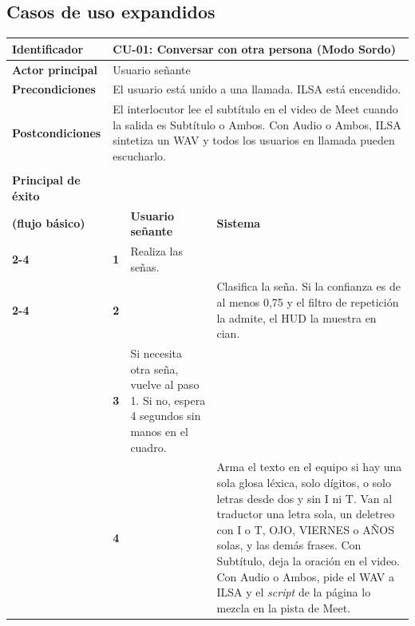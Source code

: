 \subsection{Casos de uso expandidos}

\begin{table}[h!]
\centering
\renewcommand{\arraystretch}{1.35}
\begin{tabularx}{\textwidth}{|>{\raggedright\arraybackslash\bfseries}p{4cm}|p{0.5cm}|X|X|}
\hline
Identificador & \multicolumn{3}{p{\dimexpr\textwidth-4.5cm-4\tabcolsep\relax}|}{\textbf{CU-01: Conversar con otra persona (Modo Sordo)}} \\ \hline
Actor principal & \multicolumn{3}{p{\dimexpr\textwidth-4.5cm-4\tabcolsep\relax}|}{Usuario señante} \\ \hline
Precondiciones & \multicolumn{3}{p{\dimexpr\textwidth-4.5cm-4\tabcolsep\relax}|}{El usuario está unido a una llamada. ILSA está encendido.} \\ \hline
Postcondiciones & \multicolumn{3}{p{\dimexpr\textwidth-4.5cm-4\tabcolsep\relax}|}{El interlocutor lee el subtítulo en el video de Meet cuando la salida es Subtítulo o Ambos. Con Audio o Ambos, ILSA sintetiza un WAV y todos los usuarios en llamada pueden escucharlo.} \\ \hline
\multirow{3}{4cm}{Escenario\\ Principal de éxito\\ (flujo básico)}
 & & \textbf{Usuario señante} & \textbf{Sistema} \\ \cline{2-4}
 & \textbf{1} & Realiza las señas. & \\ \cline{2-4}
 & \textbf{2} & & Clasifica la seña. Si la confianza es de al menos 0,75 y el filtro de repetición la admite, el HUD la muestra en cian. \\ \hline
 & \textbf{3} & Si necesita otra seña, vuelve al paso 1. Si no, espera 4 segundos sin manos en el cuadro. &  \\ \hline
 & \textbf{4} & & Arma el texto en el equipo si hay una sola glosa léxica, solo dígitos, o solo letras desde dos y sin I ni T. Van al traductor una letra sola, un deletreo con I o T, OJO, VIERNES o AÑOS solas, y las demás frases. Con Subtítulo, deja la oración en el video. Con Audio o Ambos, pide el WAV a ILSA y el \textit{script} de la página lo mezcla en la pista de Meet. \\ \hline

\end{tabularx}
\end{table}
